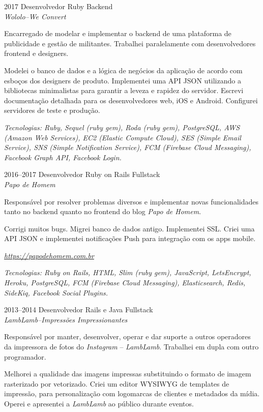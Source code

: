\documentclass[a4paper]{simplecv}
\begin{document}
\begin{topic}
\item[2017] Desenvolvedor Ruby Backend\\
	{\em\small Wololo--We Convert}

	Encarregado de modelar e implementar o backend de uma plataforma de
	publicidade e gestão de militantes. Trabalhei paralelamente com
	desenvolvedores frontend e designers.

	Modelei o banco de dados e a lógica de negócios da aplicação de acordo
	com esboços dos designers de produto. Implementei uma API JSON
	utilizando a bibliotecas minimalistas para garantir a leveza e rapidez
	do servidor. Escrevi documentação detalhada para os desenvolvedores
	web, iOS e Android. Configurei servidores de teste e produção.

	{\em\scriptsize Tecnologias: Ruby, Sequel (ruby gem), Roda (ruby gem),
	PostgreSQL, AWS (Amazon Web Services), EC2 (Elastic Compute Cloud), SES
	(Simple Email Service), SNS (Simple Notification Service), FCM
	(Firebase Cloud Messaging), Facebook Graph API, Facebook Login.}

\item[2016--2017] Desenvolvedor Ruby on Rails Fullstack\\
	{\em\small Papo de Homem}

	Responsável por resolver problemas diversos e implementar novas
	funcionalidades tanto no backend quanto no frontend do blog \emph{Papo
	de Homem}.

	Corrigi muitos bugs. Migrei banco de dados antigo. Implementei SSL.
	Criei uma API JSON e implementei notificações Push para integração com
	os apps mobile.

	{\em\scriptsize \url{https://papodehomem.com.br}}

	{\em\scriptsize Tecnologias: Ruby on Rails, HTML, Slim (ruby gem),
	JavaScript, LetsEncrypt, Heroku, PostgreSQL, FCM (Firebase Cloud
	Messaging), Elasticsearch, Redis, SideKiq, Facebook Social Plugins.}

\item[2013--2014] Desenvolvedor Rails e Java Fullstack\\
	{\em\small LambLamb--Impressões Impressionantes}

	Responsável por manter, desenvolver, operar e dar suporte a outros
	operadores da impressora de fotos do \emph{Instagram} --
	\emph{LambLamb}. Trabalhei em dupla com outro programador.

	Melhorei a qualidade das imagens impressas substituindo o formato de
	imagem rasterizado por vetorizado. Criei um editor WYSIWYG de templates
	de impressão, para personalização com logomarcas de clientes e
	metadados da mídia. Operei e apresentei a \emph{LambLamb} ao público
	durante eventos.


\end{topic}
\end{document}
